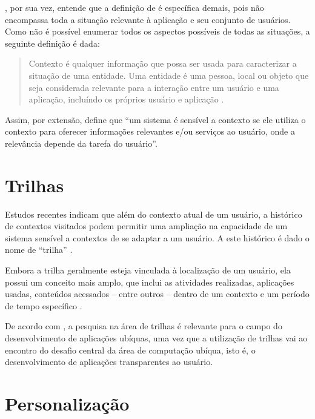 , por sua vez, entende que a definição de  é específica demais, pois não encompassa toda a situação relevante à aplicação e seu conjunto de usuários. Como não é possível enumerar todos os aspectos possíveis de todas as situações, a seguinte definição é dada:

\begin{quotation}
Contexto é qualquer informação que possa ser usada para caracterizar a situação de uma entidade. Uma entidade é uma pessoa, local ou objeto que seja considerada relevante para a interação entre um usuário e uma aplicação, incluíndo os próprios usuário e aplicação \cite{dey2001}.
\end{quotation}

Assim, por extensão,  define que ``um sistema é sensível a contexto se ele utiliza o contexto para oferecer informações relevantes e/ou serviços ao usuário, onde a relevância depende da tarefa do usuário''.


\section{Trilhas}
\label{sec:trilhas}

Estudos recentes indicam que além do contexto atual de um usuário, a histórico de contextos visitados podem permitir uma ampliação na capacidade de um sistema sensível a contextos de se adaptar a um usuário. A este histórico é dado o nome de ``trilha'' \cite{silva09,driver08,clarke04}.

Embora a trilha geralmente esteja vinculada à localização de um usuário, ela possui um conceito mais amplo, que inclui as atividades realizadas, aplicações usadas, conteúdos acessados -- entre outros -- dentro de um contexto e um período de tempo específico \cite{silva09}.

De acordo com , a pesquisa na área de trilhas é relevante para o campo do desenvolvimento de aplicações ubíquas, uma vez que a utilização de trilhas vai ao encontro do desafio central da área de computação ubíqua, isto é, o desenvolvimento de aplicações transparentes ao usuário.


\section{Personalização}
\label{sec:personalizacao}

